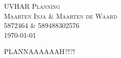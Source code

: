 \documentclass[10pt, titlepage, oneside, a4paper]{article}
\begin{document}
\begin{center}
\textsc{\LARGE UVHAR Planning}\\[10pt]
\textsc{\Large Maarten Inja \& Maarten de Waard}\\[10pt]
\textsc{\large 5872464 \& 589488302576}\\
{\large \today}
\end{center}

PLANNAAAAAAH?!?!
\end{document}
